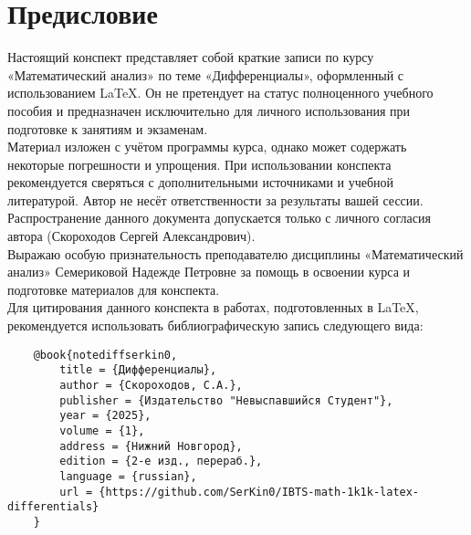 \section*{Предисловие}

Настоящий конспект представляет собой краткие записи по курсу «Математический анализ» по теме «Дифференциалы», оформленный с использованием \LaTeX. Он не претендует на статус полноценного учебного пособия и предназначен исключительно для личного использования при подготовке к занятиям и экзаменам.\\

Материал изложен с учётом программы курса, однако может содержать некоторые погрешности и упрощения. При использовании конспекта рекомендуется сверяться с дополнительными источниками и учебной литературой. Автор не несёт ответственности за результаты вашей сессии.\\

Распространение данного документа допускается только с личного согласия автора (Скороходов Сергей Александрович).\\

Выражаю особую признательность преподавателю дисциплины «Математический анализ» Семериковой Надежде Петровне за помощь в освоении курса и подготовке материалов для конспекта.\\

Для цитирования данного конспекта в работах, подготовленных в \LaTeX, рекомендуется использовать библиографическую запись следующего вида:
\begin{verbatim}
	@book{notediffserkin0,
		title = {Дифференциалы},
		author = {Скороходов, С.А.},
		publisher = {Издательство "Невыспавшийся Студент"},
		year = {2025},
		volume = {1},
		address = {Нижний Новгород},
		edition = {2-е изд., перераб.},
		language = {russian},
		url = {https://github.com/SerKin0/IBTS-math-1k1k-latex-differentials}
	}
\end{verbatim}